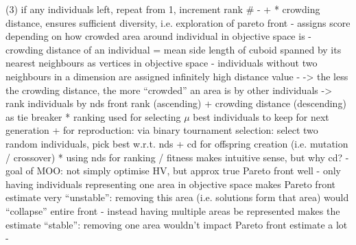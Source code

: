 \documentclass[twoside,11pt]{article}
\begin{document}
        (3) if any individuals left, repeat from 1, increment rank \#
        - \citep[p. 201]{genetic_algos} + \citep[pp. 183f]{NSGA_II}
      * crowding distance, ensures sufficient diversity, i.e. exploration of pareto front
        - assigns score depending on how crowded area around individual in objective space is
        - crowding distance of an individual = mean side length of cuboid spanned by its nearest neighbours as vertices in objective space
        - individuals without two neighbours in a dimension are assigned infinitely high distance value
        - \citep[p. 185]{NSGA_II}
        -> the less the crowding distance, the more ``crowded'' an area is by other individuals
      -> rank individuals by nds front rank (ascending) + crowding distance (descending) as tie breaker
  * ranking used for selecting $\mu$ best individuals to keep for next generation + for reproduction: via binary tournament selection: select two random individuals,
    pick best w.r.t. nds + cd for offspring creation (i.e. mutation / crossover)
  * using nds for ranking / fitness makes intuitive sense, but why cd?
    - goal of MOO: not simply optimise HV, but approx true Pareto front well
    - only having individuals representing one area in objective space makes Pareto front estimate very ``unstable'': removing this area (i.e. solutions form that area)
      would ``collapse'' entire front
    - instead having multiple areas be represented makes the estimate ``stable'': removing one area wouldn't impact Pareto front estimate a lot
    - \citep[p. 185, pp. 189-192]{genetic_algos}


\end{document}
